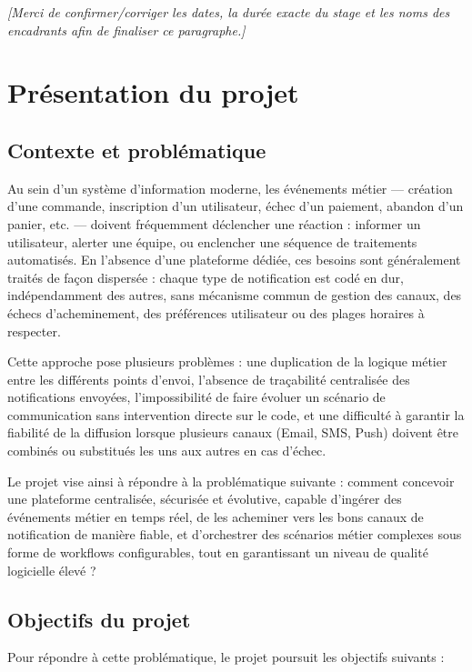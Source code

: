 \documentclass[12pt,a4paper]{report}
\newcommand{\placeholder}[1]{\par\smallskip\noindent\textcolor{placeholderred}{\itshape [#1]}\par\smallskip}
\begin{document}
\placeholder{Merci de confirmer/corriger les dates, la durée exacte du stage et les noms des encadrants afin de finaliser ce paragraphe.}

\section{Présentation du projet}

\subsection{Contexte et problématique}

Au sein d'un système d'information moderne, les événements métier --- création d'une commande, inscription d'un utilisateur, échec d'un paiement, abandon d'un panier, etc. --- doivent fréquemment déclencher une réaction : informer un utilisateur, alerter une équipe, ou enclencher une séquence de traitements automatisés. En l'absence d'une plateforme dédiée, ces besoins sont généralement traités de façon dispersée : chaque type de notification est codé en dur, indépendamment des autres, sans mécanisme commun de gestion des canaux, des échecs d'acheminement, des préférences utilisateur ou des plages horaires à respecter.

Cette approche pose plusieurs problèmes : une duplication de la logique métier entre les différents points d'envoi, l'absence de traçabilité centralisée des notifications envoyées, l'impossibilité de faire évoluer un scénario de communication sans intervention directe sur le code, et une difficulté à garantir la fiabilité de la diffusion lorsque plusieurs canaux (Email, SMS, Push) doivent être combinés ou substitués les uns aux autres en cas d'échec.

Le projet vise ainsi à répondre à la problématique suivante : comment concevoir une plateforme centralisée, sécurisée et évolutive, capable d'ingérer des événements métier en temps réel, de les acheminer vers les bons canaux de notification de manière fiable, et d'orchestrer des scénarios métier complexes sous forme de workflows configurables, tout en garantissant un niveau de qualité logicielle élevé ?

\subsection{Objectifs du projet}

Pour répondre à cette problématique, le projet poursuit les objectifs suivants :
\end{document}
